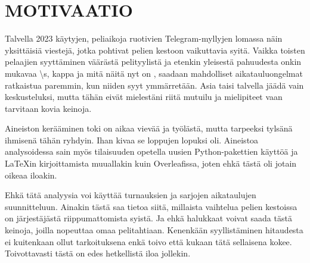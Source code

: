 \section{MOTIVAATIO}
    Talvella 2023 käytyjen, peliaikoja ruotivien Telegram-myllyjen lomassa näin yksittäisiä viestejä,
    jotka pohtivat pelien kestoon vaikuttavia syitä.
    Vaikka toisten pelaajien syyttäminen väärästä pelityylistä ja etenkin yleisestä pahuudesta onkin mukavaa
    \textendash{} \textbackslash{}s, kappa ja mitä näitä nyt on \textendash{},
    saadaan mahdolliset aikatauluongelmat ratkaistua paremmin, kun niiden syyt ymmärretään.
    Asia taisi talvella jäädä vain keskusteluksi,
    mutta tähän eivät mielestäni riitä mutuilu ja mielipiteet vaan tarvitaan kovia keinoja.

    Aineiston kerääminen toki on aikaa vievää ja työlästä, mutta tarpeeksi tylsänä ihmisenä tähän ryhdyin.
    Ihan kivaa se loppujen lopuksi oli.
    Aineistoa analysoidessa sain myös tilaisuuden opetella uusien Python-pakettien käyttöä
    ja \LaTeX{}in kirjoittamista muuallakin kuin Overleafissa,
    joten ehkä tästä oli jotain oikeaa iloakin.

    Ehkä tätä analyysia voi käyttää turnauksien ja sarjojen aikataulujen suunnitteluun.
    Ainakin tästä saa tietoa siitä, millaista vaihtelua pelien kestoissa on järjestäjästä riippumattomista syistä.
    Ja ehkä halukkaat voivat saada tästä keinoja, joilla nopeuttaa omaa pelitahtiaan.
    Kenenkään syyllistäminen hitaudesta ei kuitenkaan ollut tarkoituksena
    enkä toivo että kukaan tätä sellaisena kokee.
    Toivottavasti tästä on edes hetkellistä iloa jollekin.